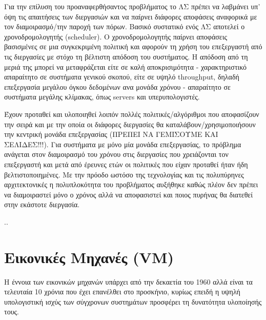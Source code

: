 Για την επίλυση του προαναφερθήσαντος προβλήματος το ΛΣ πρέπει να λαβμάνει υπ'
όψη τις απαιτήσεις των διεργασιών και να παίρνει διάφορες αποφάσεις αναφορικά με
τον διαμοιρασμό/την παροχή των πόρων. Βασικό συστατικό ενός ΛΣ αποτελεί ο
χρονοδρομολογητής (scheduler). Ο χρονοδρομολογητής παίρνει αποφάσεις βασισμένες
σε μια συγκεκριμένη πολιτική και αφορούν τη χρήση του επεξεργαστή από τις
διεργασίες με στόχο τη βέλτιστη απόδοση του συστήματος. Η απόδοση από τη μεριά
της μπορεί να μεταφράζεται είτε σε καλή αποκρισιμότητα - χαρακτηριστικό
απαραίτητο σε συστήματα γενικού σκοπού, είτε σε υψηλό throughput, δηλαδή
επεξεργασία μεγάλου όγκου δεδομένων ανα μονάδα χρόνου - απαραίτητο σε συστήματα
μεγάλης κλίμακας, όπως servers και υπερυπολογιστές.

Έχουν προταθεί και υλοποιηθεί λοιπόν πολλές πολιτικές/αλγόριθμοι που αποφασίζουν
την σειρά και με την οποία οι διάφορες διεργασίες θα καταλάβουν/χρησιμοποιήσουν
την κεντρική μονάδα επεξεργασίας (ΠΡΕΠΕΙ ΝΑ ΓΕΜΙΣΟΥΜΕ ΚΑΙ ΣΕΛΙΔΕΣ!!!). Για
συστήματα με μόνο μία μονάδα επεξεργασίας, το πρόβλημα ανάγεται στον διαμοιρασμό
του χρόνου στις διεργασίες που χρειάζονται τον επεξεργαστή και μετά από έρευνες
ετών οι πολιτικές που είχαν προταθεί ήταν ήδη βελτιστοποιημένες. Με την πρόοδο
ωστόσο της τεχνολογίας και τις πολυπύρηνες αρχιτεκτονικές η πολυπλοκότητα του
προβλήματος αυξήθηκε καθώς πλέον δεν πρέπει να διαμοιραστεί μόνο ο χρόνος αλλά
να αποφασιστεί και ποιος πυρήνας θα διατεθεί στην εκάστοτε διεργασία.


..
\section{Εικονικές Μηχανές (VM)}
Η έννοια των εικονικών μηχανών υπάρχει από την δεκαετία του 1960 αλλά είναι τα
τελευταία 10 χρόνια που έχει επανέλθει στο προσκήνιο, κυρίως επειδή η υψηλή
υπολογιστική ισχύς των σύγχρονων συστημάτων προσφέρει τη δυνατότητα υλοποίησής
τους.
